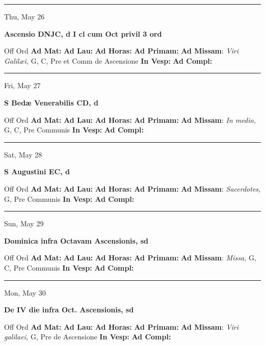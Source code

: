 \documentclass[letterpaper, 10pt]{article}
\begin{document}
\hrule
\begin{center}
Thu, May 26
\end{center}\textbf{ \large Ascensio DNJC, \textnormal{\normalsize d I cl cum Oct privil 3 ord}}
\begin{justify}
Off Ord
\textbf{Ad Mat: }
\textbf{Ad Lau: }
\textbf{Ad Horas: }
\textbf{Ad Primam: }
\textbf{Ad Missam}: \textit{Viri Galilæi,} G, C, Pre et Comm de Ascensione
\textbf{In Vesp: }
\textbf{Ad Compl: }\end{justify}



\hrule
\begin{center}
Fri, May 27
\end{center}\textbf{ \large S Bedæ Venerabilis CD, \textnormal{\normalsize d}}
\begin{justify}
Off Ord
\textbf{Ad Mat: }
\textbf{Ad Lau: }
\textbf{Ad Horas: }
\textbf{Ad Primam: }
\textbf{Ad Missam}: \textit{In medio,} G, C, Pre Communis
\textbf{In Vesp: }
\textbf{Ad Compl: }\end{justify}



\hrule
\begin{center}
Sat, May 28
\end{center}\textbf{ \large S Augustini EC, \textnormal{\normalsize d}}
\begin{justify}
Off Ord
\textbf{Ad Mat: }
\textbf{Ad Lau: }
\textbf{Ad Horas: }
\textbf{Ad Primam: }
\textbf{Ad Missam}: \textit{Sacerdotes,} G, Pre Communis
\textbf{In Vesp: }
\textbf{Ad Compl: }\end{justify}



\hrule
\begin{center}
Sun, May 29
\end{center}\textbf{ \large Dominica infra Octavam Ascensionis, \textnormal{\normalsize sd}}
\begin{justify}
Off Ord
\textbf{Ad Mat: }
\textbf{Ad Lau: }
\textbf{Ad Horas: }
\textbf{Ad Primam: }
\textbf{Ad Missam}: \textit{Missa,} G, C, Pre Communis
\textbf{In Vesp: }
\textbf{Ad Compl: }\end{justify}



\hrule
\begin{center}
Mon, May 30
\end{center}\textbf{ \large De IV die infra Oct. Ascensionis, \textnormal{\normalsize sd}}
\begin{justify}
Off Ord
\textbf{Ad Mat: }
\textbf{Ad Lau: }
\textbf{Ad Horas: }
\textbf{Ad Primam: }
\textbf{Ad Missam}: \textit{Viri galilaei,} G, Pre de Ascensione
\textbf{In Vesp: }
\textbf{Ad Compl: }\end{justify}
\end{document}
